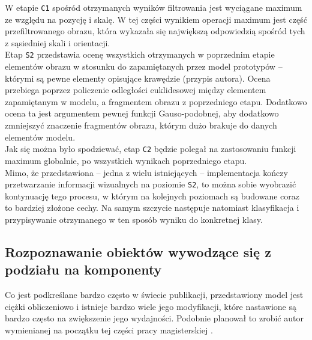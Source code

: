 W etapie \texttt{C1} spośród otrzymanych wyników filtrowania jest wyciągane maximum ze względu na pozycję i skalę. W tej części wynikiem operacji maximum jest część przefiltrowanego obrazu, która wykazała się największą odpowiedzią spośród tych z sąsiedniej skali i orientacji.\\

Etap \texttt{S2} przedstawia ocenę wszystkich otrzymanych w poprzednim etapie elementów obrazu w stosunku do zapamiętanych przez model prototypów -- którymi są pewne elementy opisujące krawędzie (przypis autora). Ocena przebiega poprzez policzenie odległości euklidesowej między elementem zapamiętanym w modelu, a fragmentem obrazu z poprzedniego etapu. Dodatkowo ocena ta jest argumentem pewnej funkcji Gauso-podobnej, aby dodatkowo zmniejszyć znaczenie fragmentów obrazu, którym dużo brakuje do danych elementów modelu.\\

Jak się można było spodziewać, etap \texttt{C2} będzie polegał na zastosowaniu funkcji maximum globalnie, po wszystkich wynikach poprzedniego etapu.\\

Mimo, że przedstawiona -- jedna z wielu istniejących -- implementacja kończy przetwarzanie informacji wizualnych na poziomie \texttt{S2}, to można sobie wyobrazić kontynuację tego procesu, w którym na kolejnych poziomach są budowane coraz to bardziej złożone cechy. Na samym szczycie następuje natomiast klasyfikacja i przypisywanie otrzymanego w ten sposób wyniku do konkretnej klasy.

\subsection{Rozpoznawanie obiektów wywodzące się z podziału na komponenty}
\label{componentBasedObjectRecognition}
 
Co jest podkreślane bardzo często w świecie publikacji, przedstawiony model jest ciężki obliczeniowo i istnieje bardzo wiele jego modyfikacji, które nastawione są bardzo często na zwiększenie jego wydajności. Podobnie planował to zrobić autor wymienianej na początku tej części pracy magisterskiej \cite{Lopez2008}.\\


